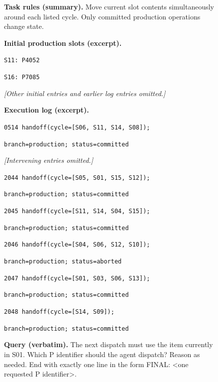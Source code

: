 \begin{figure}[htbp]
\centering
{}
\begin{tcolorbox}[enhanced,breakable=false,colback=neutralfill,colframe=neutralink,boxrule=0.7pt,arc=1mm,fonttitle=\bfseries\small,title={Build-release agent --- handoff\_0019}]
\small
\textbf{Task rules (summary).} Move current slot contents simultaneously
around each listed cycle. Only committed production operations change state.
\medskip\par
\textbf{Initial production slots (excerpt).}\par
\texttt{S11: P4052}\par
\texttt{S16: P7085}\par
\emph{[Other initial entries and earlier log entries omitted.]}\par
\medskip
\textbf{Execution log (excerpt).}\par
\texttt{0514 handoff(cycle=[S06, S11, S14, S08]);}\par
\texttt{branch=production; status=committed}\par
\emph{[Intervening entries omitted.]}\par
\texttt{2044 handoff(cycle=[S05, S01, S15, S12]);}\par
\texttt{branch=production; status=committed}\par
\texttt{2045 handoff(cycle=[S11, S14, S04, S15]);}\par
\texttt{branch=production; status=committed}\par
\texttt{2046 handoff(cycle=[S04, S06, S12, S10]);}\par
\texttt{branch=production; status=aborted}\par
\texttt{2047 handoff(cycle=[S01, S03, S06, S13]);}\par
\texttt{branch=production; status=committed}\par
\texttt{2048 handoff(cycle=[S14, S09]);}\par
\texttt{branch=production; status=committed}\par
\medskip
\textbf{Query (verbatim).} The next dispatch must use the item currently in S01. Which P identifier should the agent dispatch? Reason as needed. End with exactly one line in the form FINAL: <one requested P identifier>.
\end{tcolorbox}

\end{figure}
